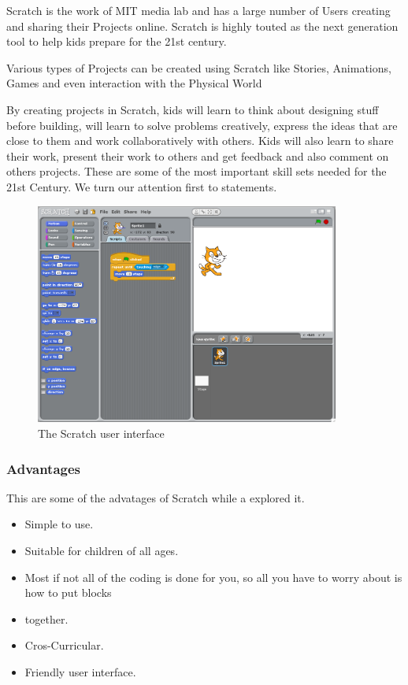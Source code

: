 Scratch is the work of MIT media lab and has a large number of Users creating and sharing their Projects online. Scratch is highly touted as the next generation tool to help kids prepare for the 21st century.

Various types of Projects can be created using Scratch like Stories, Animations, Games and even interaction with the Physical World

By creating projects in Scratch, kids will learn to think about designing stuff before building, will learn to solve problems creatively, express the ideas that are close to them and work collaboratively with others. Kids will also learn to share their work, present their work to others and get feedback and also comment on others projects. These are some of the most important skill sets needed for the 21st Century.
We turn our attention first to statements. 

\begin{figure}[!ht]
\renewcommand\thefigure{I.1} %
\centering
\includegraphics[width=10cm]{scratch.png}
\caption{The Scratch user interface }\label{figI1}
\end{figure}

\subsubsection{Advantages}

This are some of the advatages of Scratch while a explored it.

\begin{itemize}
\item Simple to use.
\item Suitable for children of all ages.
\item Most if not all of the coding is done for you, so all you have to worry about is how to put blocks \item together.
\item Cros-Curricular.
\item Friendly user interface.
\end{itemize}


